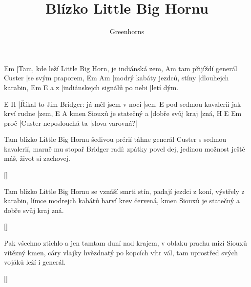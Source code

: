 \documentclass{song}
\title{Blízko Little Big Hornu}
\author{Greenhorns}
\begin{document}
\strophe
Em
|Tam, kde leží Little Big Horn, je indiánská zem,
                            Am
tam přijíždí generál Custer |se svým praporem,
Em                          Am
|modrý kabáty jezdců, stíny |dlouhejch karabin,
    Em                            E
a z |indiánskejch signálů po nebi |letí dým.
\endstrophe

E                                         H\7
|Říkal to Jim Bridger: já měl jsem v noci |sen,
                                    E
pod sedmou kavalerií jak krví rudne |zem,
                          E\7              A
kmen Siouxů je statečný a |dobře svůj kraj |zná,
     H\7                    E              Em
proč |Custer neposlouchá ta |slova varovná?|
\endstrophe

\strophe*
Tam blízko Little Big Hornu šedivou prérií
táhne generál Custer s sedmou kavalerií,
marně mu stopař Bridger radí: zpátky povel dej,
jedinou možnost ještě máš, život si zachovej.
\endstrophe

\ref{}

\strophe*
Tam blízko Little Big Hornu se vznáší smrti stín,
padají jezdci z koní, výstřely z karabin,
límce modrejch kabátů barví krev červená,
kmen Siouxů je statečný a dobře svůj kraj zná.
\endstrophe

\ref{}

\strophe*
Pak všechno ztichlo a jen tamtam duní nad krajem,
v oblaku prachu mizí Siouxů vítězný kmen,
cáry vlajky hvězdnatý po kopcích vítr vál,
tam uprostřed svých vojáků leží i generál.
\endstrophe

\ref{}
\end{document}
